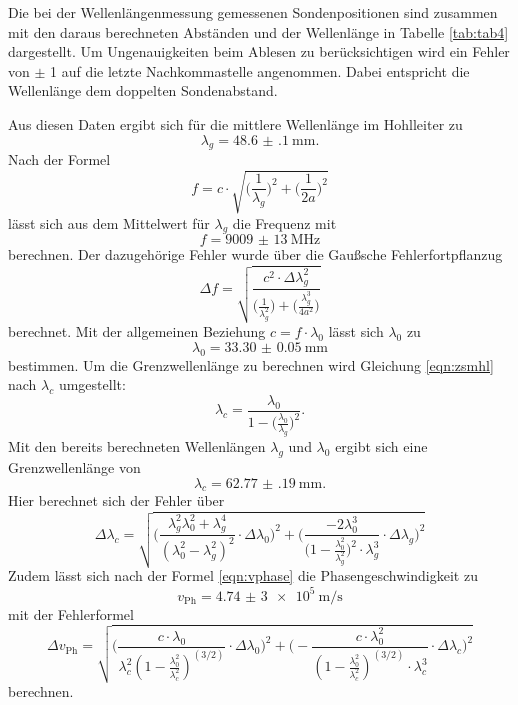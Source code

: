 Die bei der Wellenlängenmessung gemessenen Sondenpositionen sind zusammen mit den daraus berechneten Abständen
und der Wellenlänge in Tabelle \ref{tab:tab4} dargestellt. Um Ungenauigkeiten beim Ablesen zu berücksichtigen wird ein
Fehler von $\pm$ 1 auf die letzte Nachkommastelle angenommen. Dabei entspricht die Wellenlänge dem doppelten
Sondenabstand.

Aus diesen Daten ergibt sich für die mittlere Wellenlänge im Hohlleiter zu
\begin{equation}
  \lambda_g = \SI{48.6(1)}{\mm}.
\end{equation}
Nach der Formel
\begin{equation}
  f=c\cdot\sqrt{\Big(\frac{1}{\lambda_g}\Big)^2 + \Big(\frac{1}{2a}\Big)^2}
\end{equation}
lässt sich aus dem Mittelwert für $\lambda_g$ die Frequenz mit
\begin{equation}
  f=\SI{9009(13)}{\MHz}
\end{equation}
berechnen. Der dazugehörige Fehler wurde über die Gaußsche Fehlerfortpflanzug
\begin{equation}
  \Delta f=\sqrt{\frac{c^2\cdot\Delta \lambda^2_g}{\Big(\frac{1}{\lambda^2_g}\Big)+\Big(\frac{\lambda^3_g}{4a^2}\Big)}}
\end{equation}
berechnet.
Mit der allgemeinen Beziehung $c=f\cdot\lambda_0$ lässt sich $\lambda_0$ zu
\begin{equation}
  \lambda_0=\SI{33.30(5)}{\mm}
\end{equation}
bestimmen. Um die Grenzwellenlänge zu berechnen wird Gleichung \ref{eqn:zsmhl} nach $\lambda_c$ umgestellt:
\begin{equation}
  \lambda_c=\frac{\lambda_0}{1-\Big(\frac{\lambda_0}{\lambda_g}\Big)^2}.
\end{equation}
Mit den bereits berechneten Wellenlängen $\lambda_g$ und $\lambda_0$ ergibt sich eine Grenzwellenlänge von
\begin{equation}
  \lambda_c=\SI{62.77(19)}{\mm}.
\end{equation}
Hier berechnet sich der Fehler über
\begin{equation}
  \Delta\lambda_c=\sqrt{\Bigg(\frac{\lambda^2_g\lambda^2_0 + \lambda^4_g}{(\lambda^2_0-\lambda^2_g)^2}\cdot\Delta\lambda_0\Bigg)^2+
  \Bigg(\frac{-2\lambda^3_0}{\Big(1-\frac{\lambda^2_0}{\lambda^2_g}\Big)^2\cdot\lambda^3_g}\cdot\Delta\lambda_g\Bigg)^2}
\end{equation}
Zudem lässt sich nach der Formel \ref{eqn:vphase} die Phasengeschwindigkeit zu
\begin{equation}
  v_\text{Ph}=\SI{4,74(3)e5}{\m\per\s}
\end{equation}
mit der Fehlerformel
\begin{equation}
  \Delta v_\text{Ph}=\sqrt{\Bigg(\frac{c\cdot\lambda_0}{\lambda^2_c(1-\frac{\lambda^2_0}{\lambda^2_c})^{(3/2)}}\cdot\Delta\lambda_0\Bigg)^2
  +\Bigg(-\frac{c\cdot\lambda^2_0}{(1-\frac{\lambda^2_0}{\lambda^2_c})^{(3/2)}\cdot\lambda^3_c} \cdot\Delta\lambda_c\Bigg)^2}
\end{equation}
berechnen.
